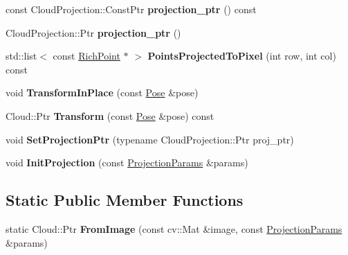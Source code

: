 \begin{DoxyCompactItemize}
\mbox{\label{classdepth__clustering_1_1Cloud_a6ac41fa70ba489c0784b197350668ec4}} 
const Cloud\+Projection\+::\+Const\+Ptr {\bfseries projection\+\_\+ptr} () const
\item 
\mbox{\label{classdepth__clustering_1_1Cloud_ac973b1445bd435f0f2df0dc06b654f07}} 
Cloud\+Projection\+::\+Ptr {\bfseries projection\+\_\+ptr} ()
\item 
\mbox{\label{classdepth__clustering_1_1Cloud_a8821b4a97d1f8b4e6415731f3e2b2f89}} 
std\+::list$<$ const \hyperlink{classdepth__clustering_1_1RichPoint}{Rich\+Point} $\ast$ $>$ {\bfseries Points\+Projected\+To\+Pixel} (int row, int col) const
\item 
\mbox{\label{classdepth__clustering_1_1Cloud_a448638dcb9f8e5a17370ba81e9e80d68}} 
void {\bfseries Transform\+In\+Place} (const \hyperlink{classdepth__clustering_1_1Pose}{Pose} \&pose)
\item 
\mbox{\label{classdepth__clustering_1_1Cloud_a93a9d173055f3a624db2fe4b1345eb13}} 
Cloud\+::\+Ptr {\bfseries Transform} (const \hyperlink{classdepth__clustering_1_1Pose}{Pose} \&pose) const
\item 
\mbox{\label{classdepth__clustering_1_1Cloud_abc1dcb82d072a45e8c00170cc927f537}} 
void {\bfseries Set\+Projection\+Ptr} (typename Cloud\+Projection\+::\+Ptr proj\+\_\+ptr)
\item 
\mbox{\label{classdepth__clustering_1_1Cloud_a052108fe3780dec4209b80e8b7886457}} 
void {\bfseries Init\+Projection} (const \hyperlink{classdepth__clustering_1_1ProjectionParams}{Projection\+Params} \&params)
\end{DoxyCompactItemize}
\subsection*{Static Public Member Functions}
\begin{DoxyCompactItemize}
\item 
\mbox{\label{classdepth__clustering_1_1Cloud_a30f8b04595f44fc56d42f556efbebe7f}} 
static Cloud\+::\+Ptr {\bfseries From\+Image} (const cv\+::\+Mat \&image, const \hyperlink{classdepth__clustering_1_1ProjectionParams}{Projection\+Params} \&params)
\end{DoxyCompactItemize}
